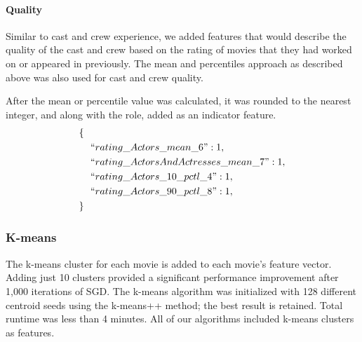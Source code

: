 \documentclass[journal]{IEEEtran}
\begin{document}
\paragraph{Quality}

Similar to cast and crew experience, we added features that would describe the quality of the cast and crew based on the rating of movies that they had worked on or appeared in previously.  The mean and percentiles approach as described above was also used for cast and crew quality.
\begin{center}
\end{center}

After the mean or percentile value was calculated, it was rounded to the nearest integer, and along with the role, added as an indicator feature.
\begin{align*}
        \{\ \ &\\
        &``rating\_Actors\_mean\_6": 1,\\
        &``rating\_ActorsAndActresses\_mean\_7": 1,\\
        &``rating\_Actors\_10\_pctl\_4": 1,\\
        &``rating\_Actors\_90\_pctl\_8": 1,\\
        \}\ \ &
\end{align*}

\subsubsection{K-means}
The k-means cluster for each movie is added to each movie's feature vector.
Adding just 10 clusters provided a significant performance improvement after
1,000 iterations of SGD.  The k-means algorithm was initialized with 128 different
centroid seeds using the k-means++ method; the best result is retained.  Total
runtime was less than 4 minutes.  All of our algorithms included k-means clusters as features.
\end{document}
